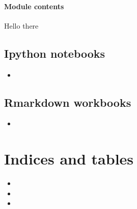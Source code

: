 \documentclass[letterpaper,10pt,english]{sphinxmanual}
\begin{document}
\subsubsection{Module contents}
\label{\detokenize{omicidx:module-omicidx}}\label{\detokenize{omicidx:module-contents}}
Hello there


\section{Ipython notebooks}
\label{\detokenize{index:ipython-notebooks}}\begin{itemize}
\item {} 

\end{itemize}


\section{Rmarkdown workbooks}
\label{\detokenize{index:rmarkdown-workbooks}}\begin{itemize}
\item {} 

\end{itemize}


\chapter{Indices and tables}
\label{\detokenize{index:indices-and-tables}}\begin{itemize}
\item {} 

\item {} 

\item {} 

\end{itemize}
\end{document}
